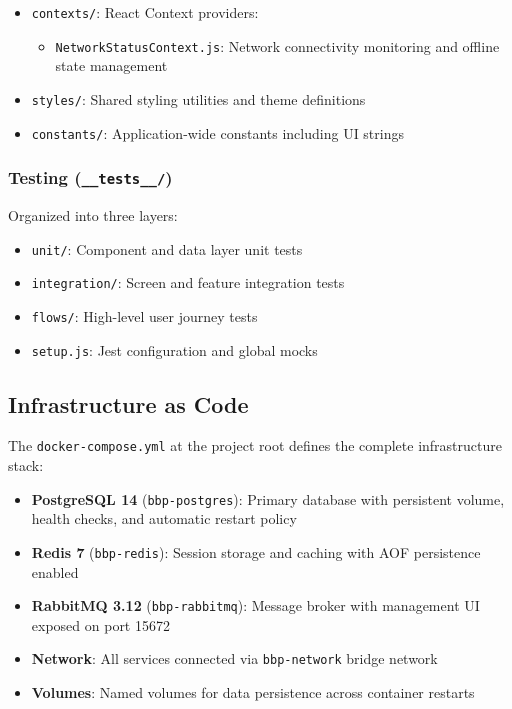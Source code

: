 \begin{itemize}
    \item \texttt{contexts/}: React Context providers:
    \begin{itemize}
        \item \texttt{NetworkStatusContext.js}: Network connectivity monitoring and offline state management
    \end{itemize}
    
    \item \texttt{styles/}: Shared styling utilities and theme definitions
    
    \item \texttt{constants/}: Application-wide constants including UI strings
\end{itemize}

\subsubsection{Testing (\texttt{\_\_tests\_\_/})}
Organized into three layers:
\begin{itemize}
    \item \texttt{unit/}: Component and data layer unit tests
    \item \texttt{integration/}: Screen and feature integration tests
    \item \texttt{flows/}: High-level user journey tests
    \item \texttt{setup.js}: Jest configuration and global mocks
\end{itemize}

\subsection{Infrastructure as Code}
\label{subsec:infrastructure_code}

The \texttt{docker-compose.yml} at the project root defines the complete infrastructure stack:

\begin{itemize}
    \item \textbf{PostgreSQL 14} (\texttt{bbp-postgres}): Primary database with persistent volume, health checks, and automatic restart policy
    \item \textbf{Redis 7} (\texttt{bbp-redis}): Session storage and caching with AOF persistence enabled
    \item \textbf{RabbitMQ 3.12} (\texttt{bbp-rabbitmq}): Message broker with management UI exposed on port 15672
    \item \textbf{Network}: All services connected via \texttt{bbp-network} bridge network
    \item \textbf{Volumes}: Named volumes for data persistence across container restarts
\end{itemize}

